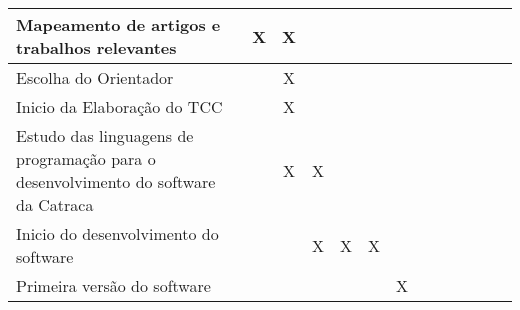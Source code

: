 \begin{table}[ht]
\begin{adjustbox}{width=\textwidth}
\begin{tabular}{|l|l|l|l|l|l|l|l|l|l|l|l|l|}
            Mapeamento de artigos e trabalhos relevantes                                         & \multicolumn{1}{c|}{X} & \multicolumn{1}{c|}{X} &                        &                        &                        &                        &                        &                        &                        &                        &                        &                        \\ \hline
            Escolha do Orientador                                                                &                        & \multicolumn{1}{c|}{X} &                        &                        &                        &                        &                        &                        &                        &                        &                        &                        \\ \hline
            Inicio da Elaboração do TCC                                                          &                        & \multicolumn{1}{c|}{X} &                        &                        &                        &                        &                        &                        &                        &                        &                        &                        \\ \hline
            Estudo das linguagens de programação para o   desenvolvimento do software da Catraca &                        & \multicolumn{1}{c|}{X} & \multicolumn{1}{c|}{X} &                        &                        &                        &                        &                        &                        &                        &                        &                        \\ \hline
            Inicio do desenvolvimento do software                                                &                        &                        & \multicolumn{1}{c|}{X} & \multicolumn{1}{c|}{X} & \multicolumn{1}{c|}{X} &                        &                        &                        &                        &                        &                        &                        \\ \hline
            Primeira versão do software                                                          &                        &                        &                        &                        &                        & \multicolumn{1}{c|}{X} &                        &                        &                        &                        &                        &                        \\ \hline

\end{tabular}
\end{adjustbox}
\end{table}
